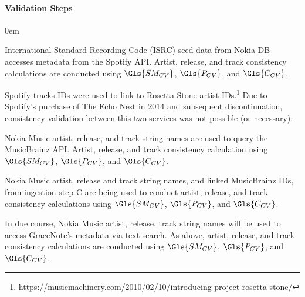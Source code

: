 \documentclass[a4paper]{article}
\begin{document}
\paragraph{Validation Steps}
\begin{description}\itemsep0em 
\item[Step 1.] International Standard Recording Code (\Gls{ISRC}) seed-data from Nokia DB accesses metadata from the Spotify \Gls{API}. Artist, release, and track consistency calculations are conducted using $\Gls{SM_{CV}}$, $\Gls{P_{CV}}$, and $\Gls{C_{CV}}$.
\item[Step 2.] Spotify tracks IDs were used to link to Rosetta Stone artist IDs.\footnote{\url{https://musicmachinery.com/2010/02/10/introducing-project-rosetta-stone/}} Due to Spotify's purchase of The Echo Nest in 2014 and subsequent discontinuation, consistency validation between this two services was not possible (or necessary).
\item[Step 3.] Nokia Music artist, release, and track string names are used to query the MusicBrainz \Gls{API}.  Artist, release, and track consistency calculation using $\Gls{SM_{CV}}$, $\Gls{P_{CV}}$, and $\Gls{C_{CV}}$.
\item[Step 4.] Nokia Music artist, release and track string names, and linked MusicBrainz IDs, from ingestion step C are being used to conduct artist, release, and track consistency calculations using $\Gls{SM_{CV}}$, $\Gls{P_{CV}}$, and $\Gls{C_{CV}}$.
\item[Step 5.] In due course, Nokia Music artist, release, track string names will be used to access GraceNote's metadata via text search. As above, artist, release, and track consistency calculations are conducted using $\Gls{SM_{CV}}$, $\Gls{P_{CV}}$, and $\Gls{C_{CV}}$.
\end{description}
\end{document}
